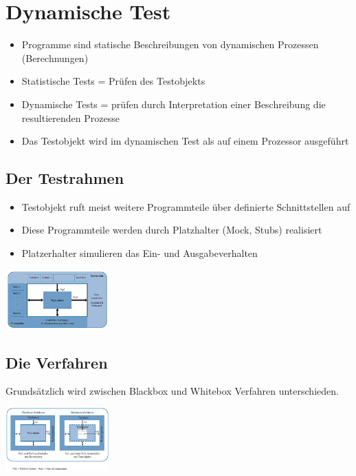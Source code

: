 \documentclass{report}
\newenvironment{Figure}
	{\par\medskip\noindent\minipage{\linewidth}}
	{\endminipage\par\medskip}
\theoremstyle{definition}
\theoremstyle{example}
\begin{document}
\chapter{Dynamische Test}
 \begin{itemize}
    \item Programme sind statische Beschreibungen von dynamischen Prozessen (Berechnungen)
    \item Statistische Tests = Prüfen des Testobjekts
    \item Dynamische Tests = prüfen durch Interpretation einer Beschreibung die resultierenden Prozesse
    \item Das Testobjekt wird im dynamischen Test als auf einem Prozessor ausgeführt
 \end{itemize}

 \section{Der Testrahmen}
 \begin{itemize}
    \item Testobjekt ruft meist weitere Programmteile über definierte Schnittstellen auf
    \item Diese Programmteile werden durch Platzhalter (Mock, Stubs) realisiert
    \item Platzerhalter simulieren das Ein- und Ausgabeverhalten
 \end{itemize}

\begin{Figure}
   \centering
    \includegraphics[width=150px]{img/Testobjekt.png}
        \label{fig:Testobjekt}
    \end{Figure}

\section{Die Verfahren}
Grundsätzlich wird zwischen Blackbox und Whitebox Verfahren unterschieden.

\begin{Figure}
   \centering
    \includegraphics[width=150px]{img/Testverfahren.png}
        \label{fig:Testverfahren}
    \end{Figure}
\end{document}
